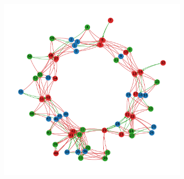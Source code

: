 \begin{figure}[H]
\centering
\hspace{-1cm}
\begin{subfigure}[c]{0.73\textwidth}
\includegraphics[width=\textwidth]{ploscb/img/combined_effective_graph_rep21_graphviz.pdf}
\end{subfigure}
\hspace*{-0.75cm}
\begin{subfigure}[c]{0.29\textwidth}

\end{subfigure}
\end{figure}
